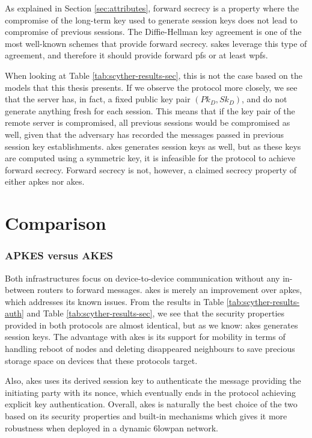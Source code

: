 As explained in Section \ref{sec:attributes}, forward secrecy is a property where the compromise of the long-term key used to generate session keys does not lead to compromise of previous sessions. The Diffie-Hellman key agreement is one of the most well-known schemes that provide forward secrecy. \gls{sakes} leverage this type of agreement, and therefore it should provide forward \gls{pfs} or at least \gls{wpfs}.

When looking at Table \ref{tab:scyther-results-sec}, this is not the case based on the models that this thesis presents. If we observe the protocol more closely, we see that the server has, in fact, a fixed public key pair $(Pk_D, Sk_D)$, and do not generate anything fresh for each session. This means that if the key pair of the remote server is compromised, all previous sessions would be compromised as well, given that the adversary has recorded the messages passed in previous session key establishments. \gls{akes} generates session keys as well, but as these keys are computed using a symmetric key, it is infeasible for the protocol to achieve forward secrecy. Forward secrecy is not, however, a claimed secrecy property of either \gls{apkes} nor \gls{akes}.


\section{Comparison}

\subsubsection{APKES versus AKES}

Both infrastructures focus on device-to-device communication without any in-between routers to forward messages. \gls{akes} is merely an improvement over \gls{apkes}, which addresses its known issues. From the results in Table \ref{tab:scyther-results-auth} and Table \ref{tab:scyther-results-sec}, we see that the security properties provided in both protocols are almost identical, but as we know: \gls{akes} generates session keys. The advantage with \gls{akes} is its support for mobility in terms of handling reboot of nodes and deleting disappeared neighbours to save precious storage space on devices that these protocols target.

Also, \gls{akes} uses its derived session key to authenticate the message providing the initiating party with its nonce, which eventually ends in the protocol achieving explicit key authentication. Overall, \gls{akes} is naturally the best choice of the two based on its security properties and built-in mechanisms which gives it more robustness when deployed in a dynamic \gls{6lowpan} network.

